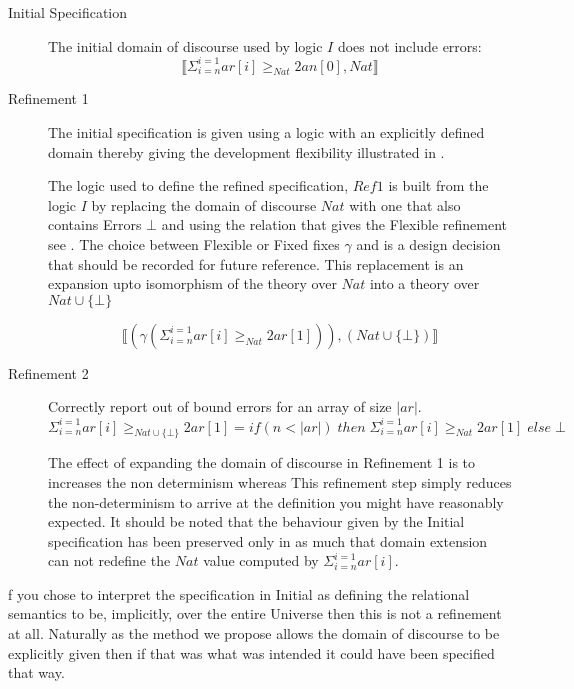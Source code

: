 \begin{description}
\item[Initial Specification]  The initial domain of discourse used by logic $I$ does not include errors:  
\[\llbracket \Sigma^{i=1}_{i=n} ar[i] \geq_{Nat} 2an[0], Nat\rrbracket \]

\item[Refinement 1]  The initial specification is given using a logic with an explicitly defined domain thereby giving the development  flexibility illustrated in .


The logic used to define the refined specification, $Ref1$ is built from the logic $I$ by replacing the domain of discourse $Nat$ with one that also contains  Errors $\bot$ and using the relation that gives the Flexible  refinement see .  The choice between Flexible or Fixed  fixes $\gamma$ and  is a design decision that should be recorded for future reference.  
This replacement is an expansion upto isomorphism of the theory over  $Nat$ into  a theory over $Nat\cup\{\bot\}$ 

\[\llbracket (\gamma (\Sigma^{i=1}_{i=n} ar[i] \geq_{Nat} 2ar[1])) , (Nat\cup \{\bot\})\rrbracket \]




\item[Refinement 2]  Correctly report out of bound errors for  an array of size $|ar|$.
\[\Sigma^{i=1}_{i=n} ar[i] \geq_{Nat\cup\{\bot\}} 2ar[1] =  if (n< |ar|) \; then  \; \Sigma^{i=1}_{i=n} ar[i] \geq_{Nat} 2ar[1] \; else \; \bot \]

The effect of expanding the domain of discourse in {\sf Refinement 1} is to increases the non determinism whereas This refinement step simply reduces the non-determinism to arrive at the definition you might have reasonably expected. It should be noted that the behaviour given by the 
Initial specification has been preserved only in as much that domain extension can not redefine the  $Nat$ value computed by $\Sigma^{i=1}_{i=n} ar[i]$. 

\end{description}


f you chose to interpret the specification in {\sf Initial} as defining the relational semantics to be, implicitly, over the entire Universe then this is not a refinement at all. Naturally as the method we propose allows the domain of discourse  to be explicitly given  then if that was what was intended it could have been specified that way.  


